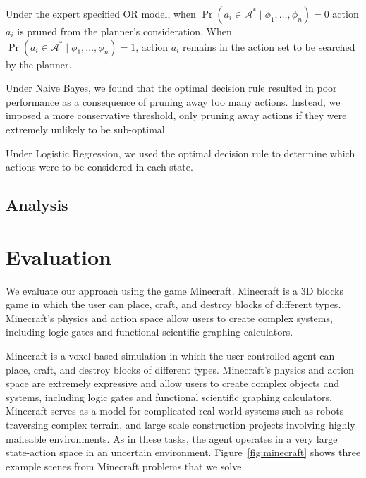 \documentclass[11pt]{article}
\begin{document}
Under the expert specified OR model, when $\Pr(a_i \in \mathcal{A}^*  \mid \phi_1, \ldots, \phi_n) = 0$
action $a_i$ is pruned from the planner's consideration. When
$\Pr(a_i \in \mathcal{A}^*  \mid \phi_1, \ldots, \phi_n) = 1$,
action $a_i$ remains in the action set to be searched by the planner.

Under Naive Bayes, we found that the optimal decision rule resulted in poor performance as a consequence of pruning away too many actions. Instead, we imposed a more conservative threshold, only pruning away actions if they were extremely unlikely to be sub-optimal.

Under Logistic Regression, we used the optimal decision rule to determine which actions were to be considered in each state.

\subsection{Analysis}

\section{Evaluation}
\label{sec:evaluation}

We evaluate our approach using the game Minecraft. Minecraft is a 3D blocks game in which the
user can place, craft, and destroy blocks of different types.
Minecraft's physics and action space allow users to create complex
systems, including logic gates and functional scientific graphing
calculators.

Minecraft is a voxel-based simulation in which the user-controlled agent can place, craft, and destroy blocks of different types.
Minecraft's physics and action space are extremely expressive and allow users to create complex objects and systems, including logic gates and functional scientific graphing calculators.
Minecraft serves as a model for complicated real world systems such as robots traversing complex terrain, and large scale construction projects involving highly malleable environments.  As in these tasks, the agent operates in a very large state-action space in an uncertain environment. Figure~\ref{fig:minecraft} shows three example scenes from Minecraft problems that we solve.

\end{document}
